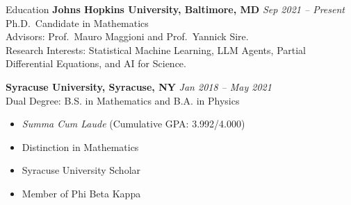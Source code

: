 \documentclass{resume}
\begin{document}
\vspace{-2mm}
\begin{rSection}{Education}
{\bf Johns Hopkins University, Baltimore, MD} \hfill {\em Sep 2021 -- Present}
\\ Ph.D.\ Candidate in Mathematics\\
Advisors: Prof.\ Mauro Maggioni and Prof.\ Yannick Sire.\\
Research Interests: Statistical Machine Learning, LLM Agents, Partial Differential Equations, and AI for Science.

{\bf Syracuse University, Syracuse, NY} \hfill {\em Jan 2018 -- May 2021}
\\Dual Degree: B.S. in Mathematics and B.A. in Physics
\vspace{-2mm}
\begin{itemize}
 
    \item \textit{Summa Cum Laude} (Cumulative GPA: 3.992/4.000)
    \item Distinction in Mathematics
    \item Syracuse University Scholar
    \item Member of Phi Beta Kappa
\end{itemize}

\end{rSection}
\end{document}
